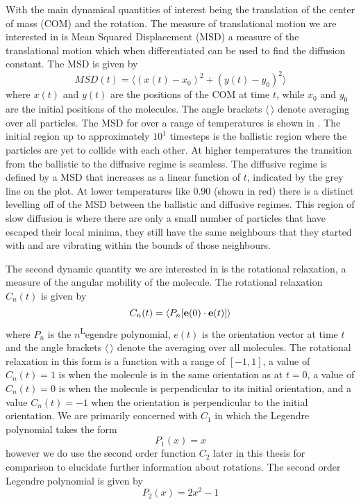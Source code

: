 With the main dynamical quantities of interest being the translation of the center of mass (COM) and the rotation. The measure of translational motion we are interested in is Mean Squared Displacement (MSD) a measure of the translational motion which when differentiated can be used to find the diffusion constant. The MSD is given by
\begin{equation}
    MSD(t) = \langle (x(t) - x_0)^2 + (y(t) - y_0)^2 \rangle
\end{equation}
where $x(t)$ and $y(t)$ are the positions of the COM at time $t$, while $x_0$ and $y_0$ are the initial positions of the molecules. The angle brackets $\langle\,\rangle$ denote averaging over all particles. The MSD for \sone over a range of temperatures is shown in . The initial region up to approximately $10^1$ timesteps is the ballistic region where the particles are yet to collide with each other. At higher temperatures the transition from the ballistic to the diffusive regime is seamless. The diffusive regime is defined by a MSD that increases as a linear function of $t$, indicated by the grey line on the plot. At lower temperatures like 0.90 (shown in red) there is a distinct levelling off of the MSD between the ballistic and diffusive regimes. This region of slow diffusion is where there are only a small number of particles that have escaped their local minima, they still have the same neighbours that they started with and are vibrating within the bounds of those neighbours.

The second dynamic quantity we are interested in is the rotational relaxation, a measure of the angular mobility of the molecule. The rotational relaxation $C_n(t)$ is given by
\begin{equation}
    C_n(t) = \langle P_n[\mathbf{e}(0) \cdot \mathbf{e}(t)] \rangle
\end{equation}
where $P_n$ is the $n$\textsuperscript Legendre polynomial, $e(t)$ is the orientation vector at time $t$ and the angle brackets $\langle\,\rangle$ denote the averaging over all molecules. The rotational relaxation in this form is a function with a range of $[-1,1]$, a value of $C_n(t)=1$ is when the molecule is in the same orientation as at $t=0$, a value of $C_n(t)=0$ is when the molecule is perpendicular to its initial orientation, and a value $C_n(t)=-1$ when the orientation is perpendicular to the initial orientation. We are primarily concerned with $C_1$ in which the Legendre polynomial takes the form
\begin{equation}
    P_1(x) = x
\end{equation}
however we do use the second order function $C_2$ later in this thesis for comparison to elucidate further information about rotations. The second order Legendre polynomial is given by
\begin{equation}
    P_2(x) = 2x^2 - 1
\end{equation}


